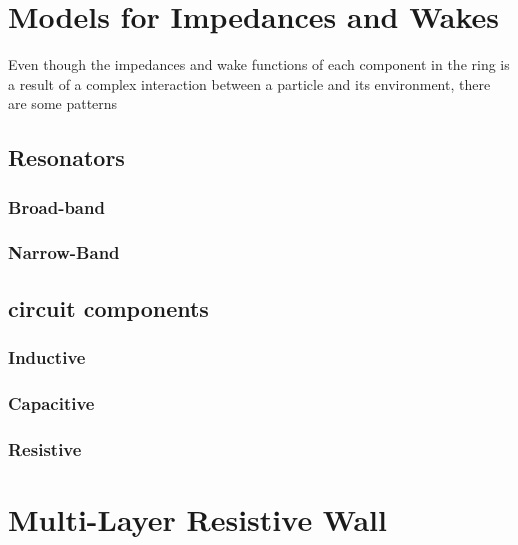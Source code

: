 \section{Models for Impedances and Wakes}

    Even though the impedances and wake functions of each component in the ring is a result of a complex interaction between a particle and its environment, there are some patterns

\subsection{Resonators}
\subsubsection{Broad-band}
\subsubsection{Narrow-Band}
\subsection{circuit components}
\subsubsection{Inductive}
\subsubsection{Capacitive}
\subsubsection{Resistive}

\section{Multi-Layer Resistive Wall}

